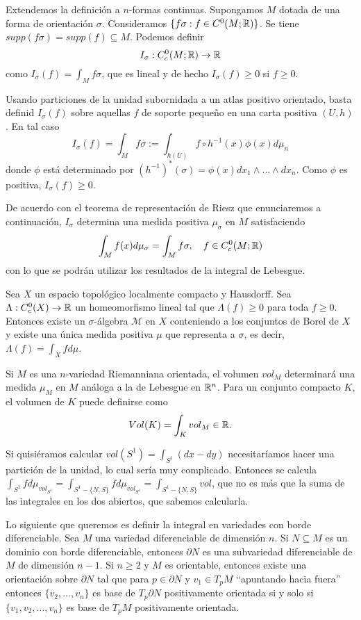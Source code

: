 \documentclass[CV.tex]{subfiles}
\begin{document}
\begin{nota}
Extendemos la definición a $n$-formas continuas. Supongamos $M$ dotada de una forma de orientación $\sigma$. Consideramos $\{f\sigma:f\in C^0(M;\mathbb{R})\}$. Se tiene $supp(f\sigma)=supp(f)\subseteq M$. Podemos definir 
\[
I_\sigma:C_c^0(M;\mathbb{R})\to\mathbb{R}
\]
como $I_\sigma(f)=\int_M f\sigma$, que es lineal y de hecho $I_\sigma(f)\geq 0$ si $f\geq 0$. 

Usando particiones de la unidad subornidada a un atlas positivo orientado, basta definid $I_\sigma(f)$ sobre aquellas $f$ de soporte pequeño en una carta positiva $(U,h)$. En tal caso
\[
I_\sigma(f)=\int_M f\sigma:=\int_{h(U)}f\circ h^{-1}(x)\phi(x) d\mu_n
\]
donde $\phi$ está determinado por $(h^{-1})^*(\sigma)=\phi(x)dx_1\land\dots\land dx_n$. Como $\phi$ es positiva, $I_\sigma(f)\geq 0$.

De acuerdo con el teorema de representación de Riesz que enunciaremos a continuación, $I_\sigma$ determina una medida positiva $\mu_\sigma$ en $M$ satisfaciendo
\[
\int_M f(x)d\mu_\sigma=\int_M f\sigma, \quad f\in C_c^0(M;\mathbb{R})
\]
con lo que se podrán utilizar los resultados de la integral de Lebesgue. 

\begin{teorema}
Sea $X$ un espacio topológico localmente compacto y Hausdorff. Sea $\Lambda:C_c^0(X)\to\mathbb{R}$ un homeomorfismo lineal tal que $\Lambda(f)\geq 0$ para toda $f\geq 0$. Entonces existe un $\sigma$-álgebra $\mathcal{M}$ en $X$ conteniendo a los conjuntos de Borel de $X$ y existe una única medida positiva $\mu$ que representa a $\sigma$, es decir, $\Lambda(f)=\int_X f d\mu$.
\end{teorema}

Si $M$ es una $n$-variedad Riemanniana orientada, el volumen $vol_M$ determinará una medida $\mu_M$ en $M$ análoga a la de Lebesgue en $\mathbb{R}^n$. Para un conjunto compacto $K$, el volumen de $K$ puede definirse como 
\[
Vol(K)=\int_K vol_M\in\mathbb{R}.
\]
\end{nota}

\begin{ej}
Si quisiéramos calcular $vol(S^1)=\int_{S^1} (dx- dy)$ necesitaríamos hacer una partición de la unidad, lo cual sería muy complicado. Entonces se calcula $\int_{S^1} f d\mu_{vol_{S^1}}=\int_{S^1-\{N,S\}} f d\mu_{vol_{S^1}}=\int_{S^1-\{N,S\}} vol$, que no es más que la suma de las integrales en los dos abiertos, que sabemos calcularla.
\end{ej}

Lo siguiente que queremos es definir la integral en variedades con borde diferenciable. Sea $M$ una variedad diferenciable de dimensión $n$. Si $N\subseteq M$ es un dominio con borde diferenciable, entonces $\partial N$ es una subvariedad diferenciable de $M$ de dimensión $n-1$. Si $n\geq 2$ y $M$ es orientable, entonces existe una orientación sobre $\partial N$ tal que para $p\in\partial N$ y $v_1\in T_pM$ ``apuntando hacia fuera'' entonces $\{v_2,\dots, v_n\}$ es base de $T_p\partial N$ positivamente orientada si y solo si $\{v_1,v_2,\dots, v_n\}$ es base de $T_pM$ positivamente orientada. 
\end{document}
